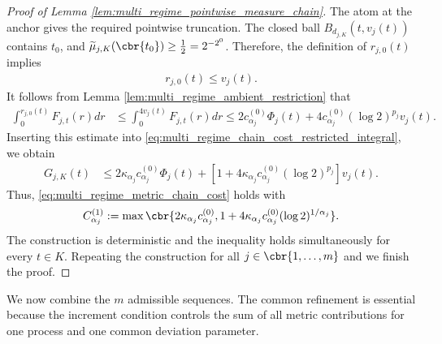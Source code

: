 \documentclass[11pt]{article}
\begin{document}
\begin{proof}[Proof of Lemma
\ref{lem:multi_regime_pointwise_measure_chain}]
The atom at the anchor gives the required pointwise truncation. The
closed ball $B_{d_{j,K}}(t,v_j(t))$ contains $t_0$, and $\widetilde\mu_{j,K}(\cbr{t_0})
\ge
\frac12
=
2^{-2^0}$. Therefore, the definition of $r_{j,0}(t)$ implies
\begin{align*}
r_{j,0}(t)
\le
v_j(t).
\end{align*}
It follows from Lemma \ref{lem:multi_regime_ambient_restriction} that
\begin{align*}
\int_0^{r_{j,0}(t)}F_{j,t}(r)dr
&\le
\int_0^{4v_j(t)}F_{j,t}(r)dr\le
2c_{\alpha_j}^{(0)}\Phi_j(t)
+
4c_{\alpha_j}^{(0)}
(\log2)^{p_j}v_j(t).
\end{align*}
Inserting this estimate into
\eqref{eq:multi_regime_chain_cost_restricted_integral}, we obtain
\begin{align*}
G_{j,K}(t)
&\le
2\kappa_{\alpha_j}c_{\alpha_j}^{(0)}\Phi_j(t)+
\left[
1+4\kappa_{\alpha_j}c_{\alpha_j}^{(0)}(\log2)^{p_j}
\right]v_j(t).
\end{align*}
Thus, \eqref{eq:multi_regime_metric_chain_cost} holds with
\begin{align*}
C_{\alpha_j}^{(1)}
:=
\max\cbr{
2\kappa_{\alpha_j}c_{\alpha_j}^{(0)},
1+4\kappa_{\alpha_j}c_{\alpha_j}^{(0)}(\log2)^{1/\alpha_j}
}.
\end{align*}
The construction is deterministic and the inequality holds
simultaneously for every $t\in K$. Repeating the construction for all
$j\in\cbr{1,\ldots,m}$ and we finish the proof.
\end{proof}

We now combine the $m$ admissible sequences. The common refinement is
essential because the increment condition controls the sum of all metric
contributions for one process and one common deviation parameter.
\end{document}
